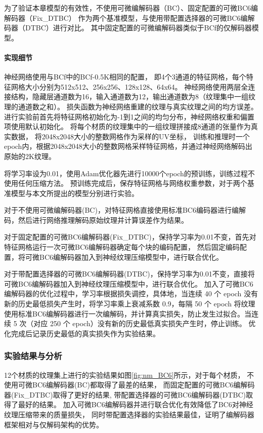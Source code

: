 为了验证本章模型的有效性，不使用可微编解码器（BC）、固定配置的可微BC6编解码器（Fix\_DTBC）
作为两个基准模型，与使用带配置选择器的可微BC6编解码器（DTBC）进行对比。
其中固定配置的可微编解码器类似于BCf\cite{weinreich2024real}的仅解码器模型。

\paragraph{实现细节}

神经网络使用与BCf\cite{weinreich2024real}中的BCf-0.5K相同的配置，
即4个3通道的特征网格，每个特征网格大小分别为512x512、256x256、128x128、64x64。
神经网络使用两层全连接结构，隐藏层通道数为16，输入通道数为12，输出通道数为8（纹理集中一组纹理的通道数之和）。
损失函数为神经网络重建的纹理与真实纹理之间的均方误差。
进行实验前首先将特征网格初始化为-1到1之间的均匀分布，神经网络权重和偏置项使用默认初始化。
将每个材质的纹理集中的一组纹理拼接成8通道的张量作为真实数据，
将2048x2048大小的整数网格作为采样的UV坐标，
训练和推理时一个epoch内，根据2048x2048大小的整数网格采样特征网格，并通过神经网络解码出原始的2K纹理。

将学习率设为0.01，使用Adam优化器先进行10000个epoch的预训练，训练过程不使用任何压缩方法。
预训练完成后，保存特征网格与网络权重参数，对于两个基准模型与本文所提出的模型分别进行实验。

对于不使用可微编解码器(BC)，对特征网格直接使用标准BC6编码器进行编解码，然后进行网络推理解码原始纹理并计算误差作为结果。

对于固定配置的可微BC6编解码器(Fix\_DTBC)，保持学习率为0.01不变，首先对特征网格运行一次可微BC6编解码器确定每个块的编码配置，
然后固定编码配置，将可微BC6编解码器加入到神经纹理压缩模型中，进行联合优化。

对于带配置选择器的可微BC6编解码器(DTBC)，保持学习率为0.01不变，直接将可微BC6编解码器加入到神经纹理压缩模型中，进行联合优化。
加入了可微BC6编解码器的优化过程中，学习率根据损失调控，具体地，当连续 40 个 epoch 没有新的历史最低损失产生时，将学习率乘上衰减系数 0.9，每隔 50 个 epoch 将纹理使用标准BC6编解码器进行一次编解码，并计算真实损失，防止发生过拟合。当连续 5 次（对应 250 个 epoch）没有新的历史最低真实损失产生时，停止训练。
优化完成后记录历史最低的真实损失作为实验结果。

\subsubsection{实验结果与分析}

12个材质的纹理集上进行的实验结果如图\ref{fig:nm_BC6}所示，对于每个材质，
不使用可微BC6编解码器(BC)都取得了最差的结果，
而固定配置的可微BC6编解码器(Fix\_DTBC)取得了更好的结果,
带配置选择器的可微BC6编解码器(DTBC)取得了最好的结果。
加入可微BC6编解码器并进行联合优化有效降低了BC6对神经纹理压缩带来的质量损失，
同时带配置选择器的实验结果最佳，证明了编解码器框架相对与仅解码架构的优势。


